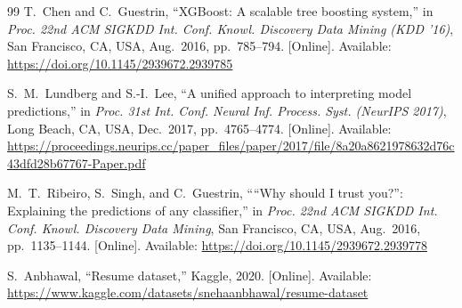 \documentclass[conference]{IEEEtran}
\begin{document}
\begin{thebibliography}{99}
T.~Chen and C.~Guestrin,
``XGBoost: A scalable tree boosting system,''
in \textit{Proc. 22nd ACM SIGKDD Int. Conf. Knowl. Discovery Data Mining
(KDD '16)}, San Francisco, CA, USA, Aug.\ 2016, pp.~785--794.
[Online]. Available: \url{https://doi.org/10.1145/2939672.2939785}

S.~M.~Lundberg and S.-I.~Lee,
``A unified approach to interpreting model predictions,''
in \textit{Proc. 31st Int. Conf. Neural Inf. Process. Syst. (NeurIPS 2017)},
Long Beach, CA, USA, Dec.\ 2017, pp.~4765--4774.
[Online]. Available: \url{https://proceedings.neurips.cc/paper_files/paper/2017/file/8a20a8621978632d76c43dfd28b67767-Paper.pdf}

M.~T.~Ribeiro, S.~Singh, and C.~Guestrin,
````Why should I trust you?'': Explaining the predictions of any classifier,''
in \textit{Proc. 22nd ACM SIGKDD Int. Conf. Knowl. Discovery Data Mining},
San Francisco, CA, USA, Aug.\ 2016, pp.~1135--1144.
[Online]. Available: \url{https://doi.org/10.1145/2939672.2939778}

S.~Anbhawal,
``Resume dataset,'' Kaggle, 2020.
[Online]. Available: \url{https://www.kaggle.com/datasets/snehaanbhawal/resume-dataset}

\end{thebibliography}
\end{document}
